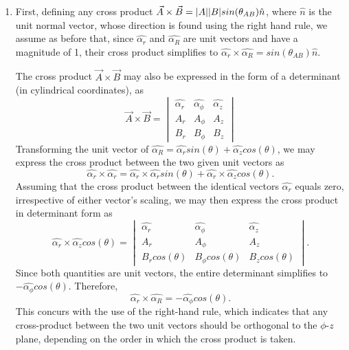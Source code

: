 \documentclass{article}
\begin{document}
\begin{enumerate}
\begin{enumerate}[label=\alph*)]
  Transforming \(\hat{\alpha_R}\) into the rectangular coordinate system, \[
		\hat{\alpha_R} = \hat{\alpha_x}sin(\theta)cos(\phi) + \hat{\alpha_y}sin(\theta)sin(\phi) + \hat{\alpha_z}cos(\theta).
	\]
	Once again applying the distributive property of the dot product and reducing orthogonal vectors to zero, as in question 1a, we are left with \[
	 \hat{\alpha_R} \cdot \hat{\alpha_y} = sin(\theta)sin(\phi). 
	\]	

	\item First, defining any cross product \(\vec{A} \times \vec{B} = |A|\space|B|sin(\theta_{AB})\hat{n}\), where \(\hat{n}\) is the unit normal vector, whose direction is found using the right hand rule, we assume as before that, since \(\hat{\alpha_{r}}\) and \(\hat{\alpha_{R}}\) are unit vectors and have a magnitude of 1, their cross product simplifies to \(\hat{\alpha_{r}} \times \hat{\alpha_{R}} = sin(\theta_{AB})\hat{n}\). 

		The cross product \(\vec{A} \times \vec{B}\) may also be expressed in the form of a determinant (in cylindrical coordinates), as \[
			\vec{A} \times \vec{B} = \begin{vmatrix}
				\hat{\alpha_r} & \hat{\alpha_{\phi}} & \hat{\alpha_z} \\
				A_r & A_{\phi} & A_z \\
				B_r & B_{\phi} & B_z
			\end{vmatrix}
		\] 
	Transforming the unit vector of \(\hat{\alpha_R} = \hat{\alpha_r}sin(\theta) + \hat{\alpha_z}cos(\theta)\), we may express the cross product between the two given unit vectors as \[
	  \hat{\alpha_r} \times \hat{\alpha_r} = \hat{\alpha_r} \times \hat{\alpha_r}sin(\theta) + \hat{\alpha_r} \times \hat{\alpha_z}cos(\theta).
  \] 
	Assuming that the cross product between the identical vectors \(\hat{\alpha_r}\) equals zero, irrespective of either vector's scaling, we may then express the cross product in determinant form as \[
		\hat{\alpha_r} \times \hat{\alpha_z}cos(\theta) = \begin{vmatrix}
			\hat{\alpha_r} & \hat{\alpha_{\phi}} & \hat{\alpha_z} \\
			A_r & A_{\phi} & A_z \\
			B_rcos(\theta) & B_{\phi}cos(\theta) & B_zcos(\theta)
		\end{vmatrix}.
	\]
	Since both quantities are unit vectors, the entire determinant simplifies to \(-\hat{\alpha_{\phi}}cos(\theta)\). Therefore, \[
		\hat{\alpha_r} \times \hat{\alpha_R} = -\hat{\alpha_{\phi}}cos(\theta).
	\]
	This concurs with the use of the right-hand rule, which indicates that any cross-product between the two unit vectors should be orthogonal to the \(\phi\)-\(z\) plane, depending on the order in which the cross product is taken.


\end{enumerate}
\end{enumerate}
\end{document}
